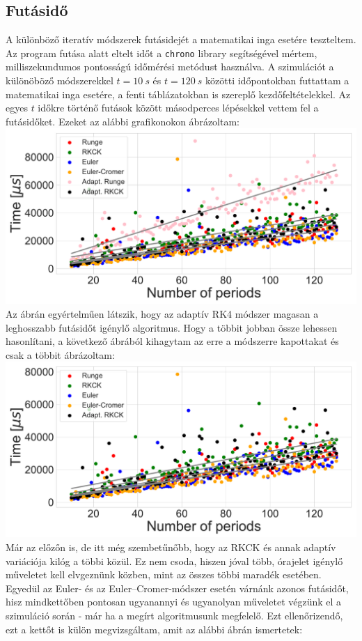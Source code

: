 \begin{multicols}{2}
\subsection{Futásidő} \label{sub:4.4}
A különböző iteratív módszerek futásidejét a matematikai inga esetére teszteltem. Az program futása alatt eltelt időt a \texttt{chrono} library segítségével mértem, milliszekundumos pontosságú időmérési metódust használva. A szimulációt a különöböző módszerekkel $t = 10\ s$ és $t = 120\ s$ közötti időpontokban futtattam a matematikai inga esetére, a fenti táblázatokban is szereplő kezdőfeltételekkel. Az egyes $t$ időkre történő futások között másodperces lépésekkel vettem fel a futásidőket. Ezeket az alábbi grafikonokon ábrázoltam:
\hfill \break \hfill \break
{\centering\includegraphics[width=.5\textwidth]{images/runtime_all.pdf}}
\hfill \break
Az ábrán egyértelműen látszik, hogy az adaptív RK4 módszer magasan a leghosszabb futásidőt igénylő algoritmus. Hogy a többit jobban össze lehessen hasonlítani, a következő ábrából kihagytam az erre a módszerre kapottakat és csak a többit ábrázoltam:
\hfill \break \hfill \break
{\centering\includegraphics[width=.5\textwidth]{images/runtime_all_wo_runge.pdf}}
\hfill \break
Már az előzőn is, de itt még szembetűnőbb, hogy az RKCK és annak adaptív variációja kilóg a többi közül. Ez nem csoda, hiszen jóval több, órajelet igénylő műveletet kell elvgeznünk közben, mint az összes többi maradék esetében. \\
Egyedül az Euler- és az Euler--Cromer-módszer esetén várnánk azonos futásidőt, hisz mindkettőben pontosan ugyanannyi és ugyanolyan műveletet végzünk el a szimuláció során - már ha a megírt algoritmusunk megfelelő. Ezt ellenőrizendő, ezt a kettőt is külön megvizsgáltam, amit az alábbi ábrán ismertetek:

\end{multicols}
